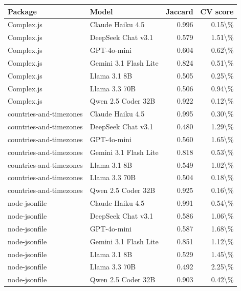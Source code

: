 \begin{table}[htbp]
\centering
{\small
\begin{tabular}{ll|rr}
\toprule
\textbf{Package} & \textbf{Model} & \textbf{Jaccard} & \textbf{CV score} \\
\midrule
Complex.js & Claude Haiku 4.5 & 0.996 & 0.15\textbackslash{}\% \\
Complex.js & DeepSeek Chat v3.1 & 0.579 & 1.51\textbackslash{}\% \\
Complex.js & GPT-4o-mini & 0.604 & 0.62\textbackslash{}\% \\
Complex.js & Gemini 3.1 Flash Lite & 0.824 & 0.51\textbackslash{}\% \\
Complex.js & Llama 3.1 8B & 0.505 & 0.25\textbackslash{}\% \\
Complex.js & Llama 3.3 70B & 0.506 & 0.94\textbackslash{}\% \\
Complex.js & Qwen 2.5 Coder 32B & 0.922 & 0.12\textbackslash{}\% \\
countries-and-timezones & Claude Haiku 4.5 & 0.995 & 0.30\textbackslash{}\% \\
countries-and-timezones & DeepSeek Chat v3.1 & 0.480 & 1.29\textbackslash{}\% \\
countries-and-timezones & GPT-4o-mini & 0.560 & 1.65\textbackslash{}\% \\
countries-and-timezones & Gemini 3.1 Flash Lite & 0.818 & 0.53\textbackslash{}\% \\
countries-and-timezones & Llama 3.1 8B & 0.549 & 1.02\textbackslash{}\% \\
countries-and-timezones & Llama 3.3 70B & 0.504 & 0.18\textbackslash{}\% \\
countries-and-timezones & Qwen 2.5 Coder 32B & 0.925 & 0.16\textbackslash{}\% \\
node-jsonfile & Claude Haiku 4.5 & 0.991 & 0.54\textbackslash{}\% \\
node-jsonfile & DeepSeek Chat v3.1 & 0.586 & 1.06\textbackslash{}\% \\
node-jsonfile & GPT-4o-mini & 0.587 & 1.68\textbackslash{}\% \\
node-jsonfile & Gemini 3.1 Flash Lite & 0.851 & 1.12\textbackslash{}\% \\
node-jsonfile & Llama 3.1 8B & 0.529 & 1.45\textbackslash{}\% \\
node-jsonfile & Llama 3.3 70B & 0.492 & 2.25\textbackslash{}\% \\
node-jsonfile & Qwen 2.5 Coder 32B & 0.903 & 0.42\textbackslash{}\% \\

\end{tabular}}
\end{table}
